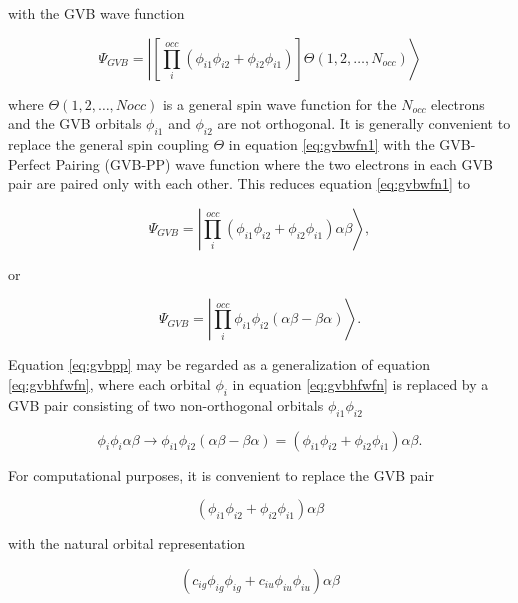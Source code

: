 \noindent with the GVB wave function \cite{Bobrowicz77}

\begin{equation}
  \Psi_{GVB} = \left|\left[\prod_i^{occ}(\phi_{i1}\phi_{i2}
	+\phi_{i2}\phi_{i1})\right]
	\Theta(1,2,\dots,N_{occ})\right\rangle
\label{eq:gvbwfn1}
\end{equation}

\noindent where $\Theta(1,2,\dots,Nocc)$ is a general spin wave
function for the $N_{occ}$ electrons and the GVB orbitals $\phi_{i1}$
and $\phi_{i2}$ are not orthogonal. It is generally convenient to
replace the general spin coupling $\Theta$ in equation
\ref{eq:gvbwfn1} with the GVB-Perfect Pairing (GVB-PP) wave function
where the two electrons in each GVB pair are paired only with each
other. This reduces equation \ref{eq:gvbwfn1} to \cite{Bobrowicz77}

\begin{equation}
   \Psi_{GVB} = \left|\prod_i^{occ}(\phi_{i1}\phi_{i2}+\phi_{i2}\phi_{i1})
	\alpha\beta\right\rangle,
\label{eq:gvbpp0}
\end{equation}

\noindent or

\begin{equation}
   \Psi_{GVB} = \left|\prod_i^{occ}\phi_{i1}\phi_{i2}
	(\alpha\beta-\beta\alpha)\right\rangle.
\label{eq:gvbpp}
\end{equation}

\noindent Equation \ref{eq:gvbpp} may be regarded as a generalization
of equation \ref{eq:gvbhfwfn}, where each orbital $\phi_i$ in equation
\ref{eq:gvbhfwfn} is replaced by a GVB pair consisting of two
non-orthogonal orbitals $\phi_{i1}\phi_{i2}$

\begin{equation}
	\phi_i\phi_i\alpha\beta \rightarrow 
	\phi_{i1}\phi_{i2}(\alpha\beta - \beta\alpha) 
	= (\phi_{i1}\phi_{i2} + \phi_{i2}\phi_{i1})\alpha\beta.
\end{equation}

For computational purposes, it is convenient to replace the GVB pair 

\begin{equation}
	\left(\phi_{i1}\phi_{i2} + \phi_{i2}\phi_{i1}\right)
	\alpha\beta
\end{equation}

\noindent with the natural orbital representation \cite{Bobrowicz77}

\begin{equation}
	\left(c_{ig}\phi_{ig}\phi_{ig}
	+c_{iu}\phi_{iu}\phi_{iu}\right)\alpha\beta
\end{equation}

